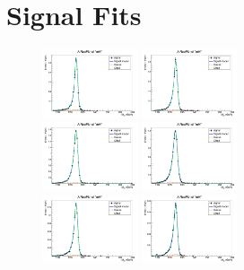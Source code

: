 \chapter{Signal Fits}\label{appendix_signal_fits}

\begin{figure}[htb]
	\begin{center}
		\includegraphics[width=0.25\textwidth]{fig/signal_fit/2016/sigfit_ele_ggF_1_125.png}
		\includegraphics[width=0.25\textwidth]{fig/signal_fit/2016/sigfit_ele_ggF_2_125.png}\\
		\includegraphics[width=0.25\textwidth]{fig/signal_fit/2016/sigfit_ele_ggF_3_125.png}
		\includegraphics[width=0.25\textwidth]{fig/signal_fit/2016/sigfit_ele_ggF_4_125.png}\\
		\includegraphics[width=0.25\textwidth]{fig/signal_fit/2016/sigfit_ele_VBF_501_125.png}
		\includegraphics[width=0.25\textwidth]{fig/signal_fit/2016/sigfit_ele_VBF_502_125.png}\\

\end{center}
\end{figure}
